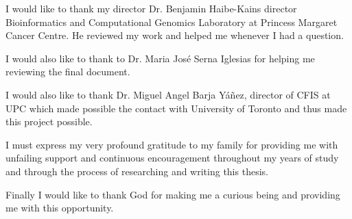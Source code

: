 

I would like to thank my director Dr. Benjamin Haibe-Kains director Bioinformatics and 
Computational Genomics Laboratory at Princess Margaret Cancer 
Centre. He reviewed my work and helped me whenever I had a question.

I would also like to thank to Dr. Maria José Serna Iglesias for helping me reviewing the 
final document.

I would also like to thank Dr. Miguel Angel Barja Yáñez, director of CFIS at UPC which 
made possible the contact with University of Toronto and thus made this project possible.

I must express my very profound gratitude to my family for providing me with unfailing 
support and continuous encouragement throughout my years of study and through the process 
of researching and writing this thesis. 

Finally I would like to thank God for making me a curious being and providing me with 
this opportunity.


